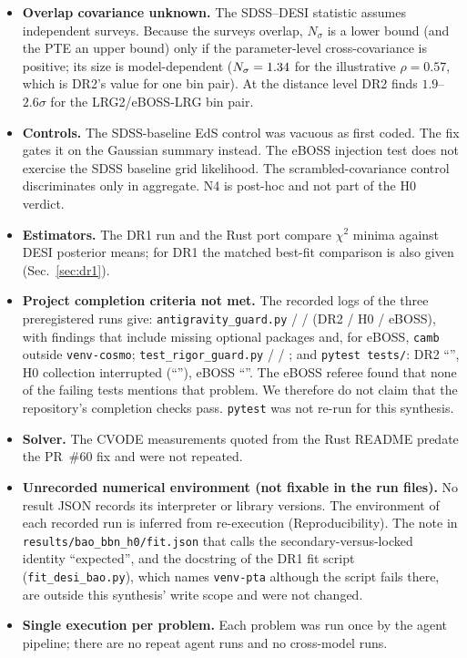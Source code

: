 \documentclass[11pt]{article}
\begin{document}
\begin{itemize}
The sensitivity shifts are small ($\dTwoRadOm\sigma$ and $\dTwoCambOm\sigma$ for DR2) but not zero.
\item \textbf{Overlap covariance unknown.} The SDSS--DESI statistic assumes independent surveys. Because the surveys overlap, $N_\sigma$ is
a lower bound (and the PTE an upper bound) only if the parameter-level cross-covariance is positive; its size is model-dependent
($N_\sigma=1.34$ for the illustrative $\rho=0.57$, which is DR2's value for one bin pair). At the distance level DR2 finds $1.9$--$2.6\sigma$ for the LRG2/eBOSS-LRG bin pair.
\item \textbf{Controls.} The SDSS-baseline EdS control was vacuous as first coded. The fix gates it on the Gaussian summary instead. The
eBOSS injection test does not exercise the SDSS baseline grid likelihood. The scrambled-covariance control discriminates only in aggregate.
N4 is post-hoc and not part of the H0 verdict.
\item \textbf{Estimators.} The DR1 run and the Rust port compare $\chi^2$ minima against DESI posterior means; for DR1 the matched best-fit
comparison is also given (Sec.~\ref{sec:dr1}).
\item \textbf{Project completion criteria not met.} The recorded logs of the three preregistered runs give:
\texttt{antigravity\_guard.py} \gTwoAnti{} / \gHzAnti{} / \gEbAnti{} (DR2 / H0 / eBOSS), with findings that include missing optional
packages and, for eBOSS, \texttt{camb} outside \texttt{venv-cosmo}; \texttt{test\_rigor\_guard.py} \gTwoRigor{} / \gHzRigor{} / \gEbRigor{};
and \texttt{pytest tests/}: DR2 ``\gTwoPytest'', H0 collection interrupted (``\gHzPytest''), eBOSS ``\gEbPytest''. The eBOSS referee
found that none of the failing tests mentions that problem. We therefore do not claim that the repository's completion checks pass.
\texttt{pytest} was not re-run for this synthesis.
\item \textbf{Solver.} The CVODE measurements quoted from the Rust README predate the PR~\#60 fix and were not repeated.
\item \textbf{Unrecorded numerical environment (not fixable in the run files).} No result JSON records its interpreter or library versions. The environment of each recorded
run is inferred from re-execution (Reproducibility). The note in \texttt{results/bao\_bbn\_h0/fit.json} that calls the secondary-versus-locked identity ``expected'', and the
docstring of the DR1 fit script (\texttt{fit\_desi\_bao.py}), which names \texttt{venv-pta} although the script fails there, are outside this synthesis' write scope and were not changed.
\item \textbf{Single execution per problem.} Each problem was run once by the agent pipeline; there are no repeat agent runs and no cross-model runs.
\end{itemize}
\end{document}
